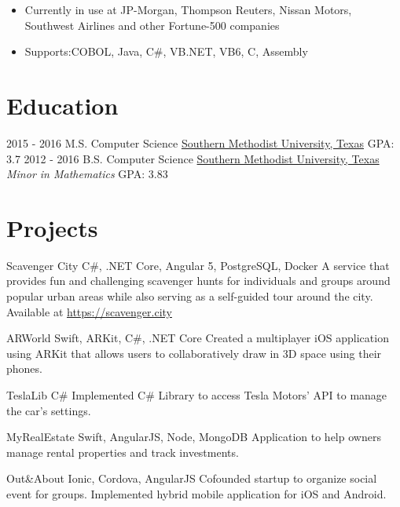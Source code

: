 \documentclass[letterpaper]{resume}
\begin{document}
\begin{twenty}
{\begin{itemize}
			\begin{itemize}
			\item Currently in use at JP-Morgan, Thompson Reuters, Nissan Motors, Southwest Airlines and other Fortune-500 companies
			
			\item Supports:COBOL, Java, C\#, VB.NET, VB6, C, Assembly
			
		\end{itemize}
		\end{itemize}
	}
\end{twenty}



\section{Education}
\begin{twenty}
	\twentyitem
	{2015 - 2016}
	{}
	{M.S. Computer Science }
	{\href{http://www.smu.edu/}{Southern Methodist University, Texas}}
	{GPA: 3.7}
	{}
	\twentyitem
	{2012 - 2016}
	{}
	{B.S. Computer Science }
	{\href{http://www.smu.edu/}{Southern Methodist University, Texas}}
	{\emph{Minor in Mathematics}}
	{GPA: 3.83}
\end{twenty}


\section{Projects}

\project
{Scavenger City}
{C\#, .NET Core, Angular 5, PostgreSQL, Docker}
{A service that provides fun and challenging scavenger hunts for individuals and groups around popular urban areas while also serving as a self-guided tour around the city. Available at \url{https://scavenger.city}}

\project
{ARWorld}
{Swift, ARKit, C\#, .NET Core}
{Created a multiplayer iOS application using ARKit that allows users to collaboratively draw in 3D space using their phones.}

\project
{TeslaLib}
{C\#}
{Implemented C\# Library to access Tesla Motors’ API to manage the car’s settings.}

\project
{MyRealEstate}
{Swift, AngularJS, Node, MongoDB}
{Application to help owners manage rental properties and track investments.}

\project
{Out\&About}
{Ionic, Cordova, AngularJS}
{Cofounded startup to organize social event for groups. Implemented hybrid mobile application for iOS and Android.}
\end{document}
